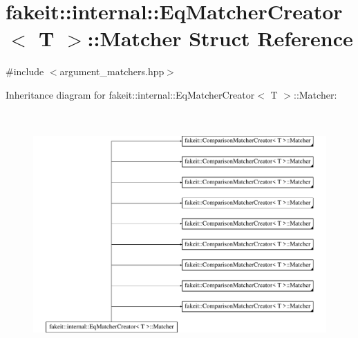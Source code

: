 \hypertarget{structfakeit_1_1internal_1_1EqMatcherCreator_1_1Matcher}{}\section{fakeit\+::internal\+::Eq\+Matcher\+Creator$<$ T $>$\+::Matcher Struct Reference}
\label{structfakeit_1_1internal_1_1EqMatcherCreator_1_1Matcher}


{\ttfamily \#include $<$argument\+\_\+matchers.\+hpp$>$}

Inheritance diagram for fakeit\+::internal\+::Eq\+Matcher\+Creator$<$ T $>$\+::Matcher\+:\begin{figure}[H]
\begin{center}
\leavevmode
\includegraphics[height=9.427609cm]{structfakeit_1_1internal_1_1EqMatcherCreator_1_1Matcher}
\end{center}
\end{figure}
